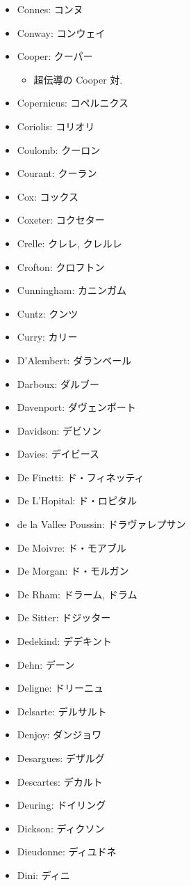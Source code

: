 \documentclass[openany, a4paper, oneside]{jsbook}
\begin{document}
\begin{itemize}
\item Connes: コンヌ
\item Conway: コンウェイ
\item Cooper: クーパー
\begin{itemize}
\item 超伝導の Cooper 対.
\end{itemize}
\item Copernicus: コペルニクス
\item Coriolis: コリオリ
\item Coulomb: クーロン
\item Courant: クーラン
\item Cox: コックス
\item Coxeter: コクセター
\item Crelle: クレレ, クレルレ
\item Crofton: クロフトン
\item Cunningham: カニンガム
\item Cuntz: クンツ
\item Curry: カリー
\item D'Alembert: ダランベール
\item Darboux: ダルブー
\item Davenport: ダヴェンポート
\item Davidson: デビソン
\item Davies: デイビース
\item De Finetti: ド・フィネッティ
\item De L'Hopital: ド・ロピタル
\item de la Vallee Poussin: ドラヴァレプサン
\item De Moivre: ド・モアブル
\item De Morgan: ド・モルガン
\item De Rham: ドラーム, ドラム
\item De Sitter: ドジッター
\item Dedekind: デデキント
\item Dehn: デーン
\item Deligne: ドリーニュ
\item Delsarte: デルサルト
\item Denjoy: ダンジョワ
\item Desargues: デザルグ
\item Descartes: デカルト
\item Deuring: ドイリング
\item Dickson: ディクソン
\item Dieudonne: ディユドネ
\item Dini: ディニ

\end{itemize}
\end{document}
